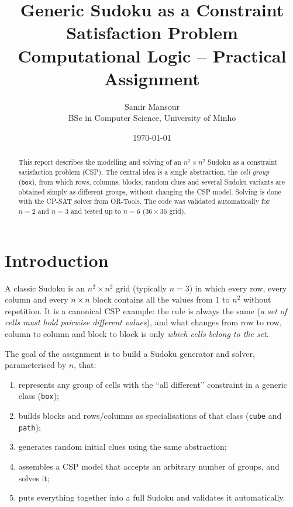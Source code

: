 \documentclass[11pt,a4paper]{article}
\title{\textbf{Generic Sudoku as a Constraint Satisfaction Problem}\\[0.4em]
\large Computational Logic -- Practical Assignment}
\author{Samir Mansour\\
        BSc in Computer Science, University of Minho}
\date{\today}
\begin{document}
\maketitle

\begin{abstract}
This report describes the modelling and solving of an $n^2\times n^2$ Sudoku as a constraint satisfaction problem (CSP). The central idea is a single abstraction, the \emph{cell group} (\texttt{box}), from which rows, columns, blocks, random clues and several Sudoku variants are obtained simply as different groups, without changing the CSP model. Solving is done with the CP-SAT solver from OR-Tools. The code was validated automatically for $n=2$ and $n=3$ and tested up to $n=6$ ($36\times 36$ grid).
\end{abstract}

\tableofcontents
\newpage

\section{Introduction}

A classic Sudoku is an $n^2\times n^2$ grid (typically $n=3$) in which every row, every column and every $n\times n$ block contains all the values from $1$ to $n^2$ without repetition. It is a canonical CSP example: the rule is always the same (\emph{a set of cells must hold pairwise different values}), and what changes from row to row, column to column and block to block is only \emph{which cells belong to the set}.

The goal of the assignment is to build a Sudoku generator and solver, parameterised by $n$, that:
\begin{enumerate}[label=\textbf{R\arabic*.}]
  \item represents any group of cells with the ``all different'' constraint in a generic class (\texttt{box});
  \item builds blocks and rows/columns as specialisations of that class (\texttt{cube} and \texttt{path});
  \item generates random initial clues using the same abstraction;
  \item assembles a CSP model that accepts an arbitrary number of groups, and solves it;
  \item puts everything together into a full Sudoku and validates it automatically.
\end{enumerate}
\end{document}
